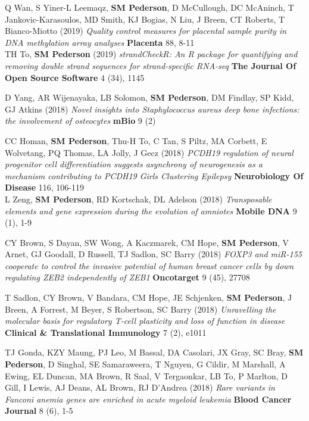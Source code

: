 \documentclass[11pt,a4paper,]{moderncv}
\begin{document}
\begin{modenumerate}
     \item Q Wan, S Yiner-L Leemaqz, \textbf{SM Pederson}, D McCullough, DC McAninch, T Jankovic-Karasoulos, MD Smith, KJ Bogias, N Liu, J Breen, CT Roberts, T Bianco-Miotto (2019) \emph{Quality control measures for placental sample purity in DNA methylation array analyses} \textbf{Placenta} 88, 8-11 \\[-4mm] 
     \moditem{*} TH To, \textbf{SM Pederson} (2019) \emph{strandCheckR: An R package for quantifying and removing double strand sequences for strand-specific RNA-seq} \textbf{The Journal Of Open Source Software} 4 (34), 1145 \\[-4mm] 
     \item D Yang, AR Wijenayaka, LB Solomon, \textbf{SM Pederson}, DM Findlay, SP Kidd, GJ Atkins (2018) \emph{Novel insights into Staphylococcus aureus deep bone infections: the involvement of osteocytes} \textbf{mBio} 9 (2) \\[-4mm] 
     \item CC Homan, \textbf{SM Pederson}, Thu-H To, C Tan, S Piltz, MA Corbett, E Wolvetang, PQ Thomas, LA Jolly, J Gecz (2018) \emph{PCDH19 regulation of neural progenitor cell differentiation suggests asynchrony of neurogenesis as a mechanism contributing to PCDH19 Girls Clustering Epilepsy} \textbf{Neurobiology Of Disease} 116, 106-119 \\[-4mm] 
     \moditem{*} L Zeng, \textbf{SM Pederson}, RD Kortschak, DL Adelson (2018) \emph{Transposable elements and gene expression during the evolution of amniotes} \textbf{Mobile DNA} 9 (1), 1-9 \\[-4mm] 
     \item CY Brown, S Dayan, SW Wong, A Kaczmarek, CM Hope, \textbf{SM Pederson}, V Arnet, GJ Goodall, D Russell, TJ Sadlon, SC Barry (2018) \emph{FOXP3 and miR-155 cooperate to control the invasive potential of human breast cancer cells by down regulating ZEB2 independently of ZEB1} \textbf{Oncotarget} 9 (45), 27708 \\[-4mm] 
     \item T Sadlon, CY Brown, V Bandara, CM Hope, JE Schjenken, \textbf{SM Pederson}, J Breen, A Forrest, M Beyer, S Robertson, SC Barry (2018) \emph{Unravelling the molecular basis for regulatory T-cell plasticity and loss of function in disease} \textbf{Clinical \& Translational Immunology} 7 (2), e1011 \\[-4mm] 
     \item TJ Gonda, KZY Maung, PJ Leo, M Bassal, DA Casolari, JX Gray, SC Bray, \textbf{SM Pederson}, D Singhal, SE Samaraweera, T Nguyen, G Cildir, M Marshall, A Ewing, EL Duncan, MA Brown, R Saal, V Tergaonkar, LB To, P Marlton, D Gill, I Lewis, AJ Deans, AL Brown, RJ D'Andrea (2018) \emph{Rare variants in Fanconi anemia genes are enriched in acute myeloid leukemia} \textbf{Blood Cancer Journal} 8 (6), 1-5 \\[-4mm] 

\end{modenumerate}
\end{document}
